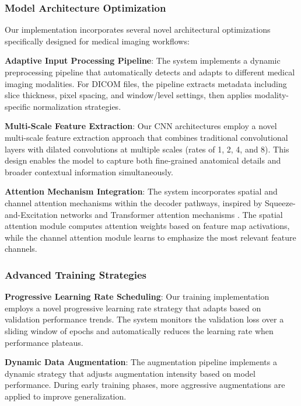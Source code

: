 \documentclass[12pt,a4paper]{article}
\begin{document}
\subsubsection{Model Architecture Optimization}

Our implementation incorporates several novel architectural optimizations specifically designed for medical imaging workflows:

\textbf{Adaptive Input Processing Pipeline}: The system implements a dynamic preprocessing pipeline that automatically detects and adapts to different medical imaging modalities. For DICOM files, the pipeline extracts metadata including slice thickness, pixel spacing, and window/level settings, then applies modality-specific normalization strategies.

\textbf{Multi-Scale Feature Extraction}: Our CNN architectures employ a novel multi-scale feature extraction approach that combines traditional convolutional layers with dilated convolutions at multiple scales (rates of 1, 2, 4, and 8). This design enables the model to capture both fine-grained anatomical details and broader contextual information simultaneously.

\textbf{Attention Mechanism Integration}: The system incorporates spatial and channel attention mechanisms within the decoder pathways, inspired by Squeeze-and-Excitation networks \cite{hu2018squeeze} and Transformer attention mechanisms \cite{vaswani2017attention}. The spatial attention module computes attention weights based on feature map activations, while the channel attention module learns to emphasize the most relevant feature channels.

\subsubsection{Advanced Training Strategies}

\textbf{Progressive Learning Rate Scheduling}: Our training implementation employs a novel progressive learning rate strategy that adapts based on validation performance trends. The system monitors the validation loss over a sliding window of epochs and automatically reduces the learning rate when performance plateaus.

\textbf{Dynamic Data Augmentation}: The augmentation pipeline implements a dynamic strategy that adjusts augmentation intensity based on model performance. During early training phases, more aggressive augmentations are applied to improve generalization.
\end{document}

